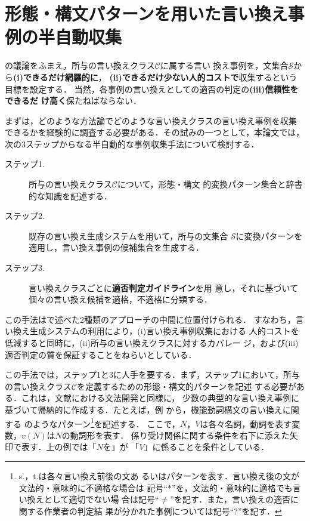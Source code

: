 \section{形態・構文パターンを用いた言い換え事例の半自動収集}
\label{sec:method}

の議論をふまえ，所与の言い換えクラス$\mathcal{C}$に属する言い
換え事例を，文集合$\mathcal{S}$から\textbf{(i)できるだけ網羅的に}，
\textbf{(ii)できるだけ少ない人的コストで}収集するという目標を設定する．
当然，各事例の言い換えとしての適否の判定の\textbf{(iii)信頼性をできるだ
  け高く}保たねばならない．

まずは，どのような方法論でどのような言い換えクラスの言い換え事例を収集
できるかを経験的に調査する必要がある．その試みの一つとして，本論文では，
次の3ステップからなる半自動的な事例収集手法について検討する．
\begin{description}
\item[ステップ1.] 所与の言い換えクラス$\mathcal{C}$について，形態・構文
  的変換パターン集合と辞書的な知識を記述する．
\item[ステップ2.] 既存の言い換え生成システムを用いて，所与の文集合
  $\mathcal{S}$に変換パターンを適用し，言い換え事例の候補集合を生成する．
\item[ステップ3.] 言い換えクラスごとに\textbf{適否判定ガイドライン}を用
  意し，それに基づいて個々の言い換え候補を適格，不適格に分類する．
\end{description}
この手法はで述べた2種類のアプローチの中間に位置付けられる．
すなわち，言い換え生成システムの利用により，(i)言い換え事例収集における
人的コストを低減すると同時に，(ii)所与の言い換えクラスに対するカバレー
ジ，および(iii)適否判定の質を保証することをねらいとしている．

この手法では，ステップ1と3に人手を要する．まず，ステップ1において，所与
の言い換えクラス$\mathcal{C}$を定義するための形態・構文的パターンを記述
する必要がある．これは，文献\cite{dras:99:a}における文法開発と同様に，
少数の典型的な言い換え事例に基づいて帰納的に作成する．たとえば，例
から，機能動詞構文の言い換えに関する
のようなパターン\footnote{s.，t.は各々言い換え前後の文あ
  るいはパターンを表す．言い換え後の文が文法的・意味的に不適格な場合は
  記号``$\ast$''を，文法的・意味的に適格でも言い換えとして適切でない場
  合は記号``$\neq$''を記す．また，言い換えの適否に関する作業者の判定結
  果が分かれた事例については記号``?''を記す．}を記述する．
ここで，$N$，$V$は各々名詞，動詞を表す変数，$v(N)$は$N$の動詞形を表す．
係り受け関係に関する条件を右下に添えた矢印で表す．上の例では「$N$を」が
「$V$」に係ることを条件としている．

